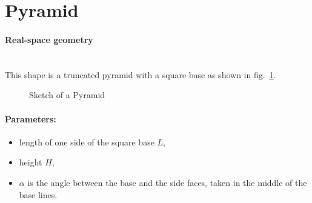 
\newpage%
\section{Pyramid}

\paragraph{Real-space geometry}\mbox{}\\
This shape is a  truncated pyramid with a square base as shown in fig.~\ref{fig:pyramid}.

\begin{figure}[ht]
\hfill
{}
\hfill
{}
\hfill
\caption{Sketch of a Pyramid}
\label{fig:pyramid}
\end{figure}

\FloatBarrier

\paragraph{Parameters:}
\begin{itemize}
\item length of one side of the square base $L$,  
\item height $H$,
\item  $\alpha$ is the angle between the base and the
  side faces, taken in the middle of the base lines.
\end{itemize}

